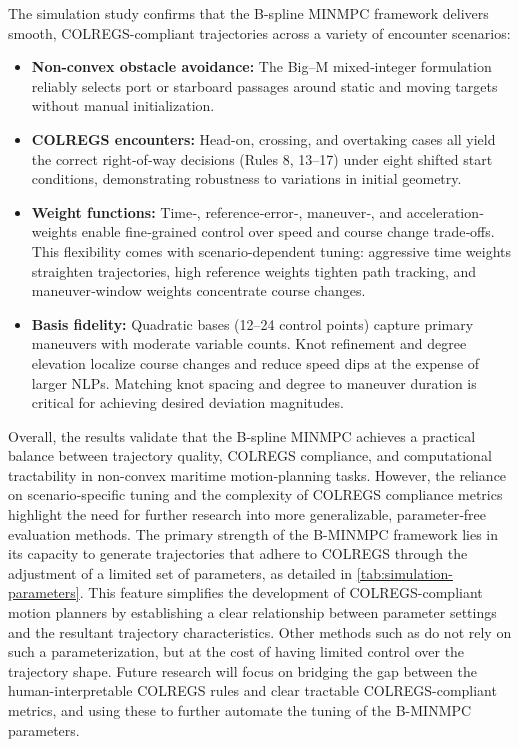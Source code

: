 The simulation study confirms that the B-spline MINMPC framework delivers smooth, COLREGS-compliant trajectories across a variety of encounter scenarios:

\begin{itemize}
  \item \textbf{Non-convex obstacle avoidance:}  
    The Big–M mixed‐integer formulation reliably selects port or starboard passages around static and moving targets without manual initialization.
  \item \textbf{COLREGS encounters:}  
    Head-on, crossing, and overtaking cases all yield the correct right‐of‐way decisions (Rules 8, 13–17) under eight shifted start conditions, demonstrating robustness to variations in initial geometry.
  \item \textbf{Weight functions:}  
    Time‐, reference‐error‐, maneuver‐, and acceleration‐weights enable fine‐grained control over speed and course change trade‐offs. This flexibility comes with scenario-dependent tuning: aggressive time weights straighten trajectories, high reference weights tighten path tracking, and maneuver‐window weights concentrate course changes. 
  \item \textbf{Basis fidelity:}  
    Quadratic bases (12–24 control points) capture primary maneuvers with moderate variable counts. Knot refinement and degree elevation localize course changes and reduce speed dips at the expense of larger NLPs. Matching knot spacing and degree to maneuver duration is critical for achieving desired deviation magnitudes.
\end{itemize}

Overall, the results validate that the B-spline MINMPC achieves a practical balance between trajectory quality, COLREGS compliance, and computational tractability in non-convex maritime motion‐planning tasks. However, the reliance on scenario‐specific tuning and the complexity of COLREGS compliance metrics highlight the need for further research into more generalizable, parameter‐free evaluation methods. 
The primary strength of the B-MINMPC framework lies in its capacity to generate trajectories that adhere to COLREGS through the adjustment of a limited set of parameters, as detailed in \cref{tab:simulation-parameters}. This feature simplifies the development of COLREGS-compliant motion planners by establishing a clear relationship between parameter settings and the resultant trajectory characteristics. Other methods such as \citet{Hagen2018,cho2021colreg,Menges2024} do not rely on such a parameterization, but at the cost of having limited control over the trajectory shape. 
Future research will focus on bridging the gap between the human-interpretable COLREGS rules and clear tractable COLREGS-compliant metrics, and using these to further automate the tuning of the B-MINMPC parameters.



